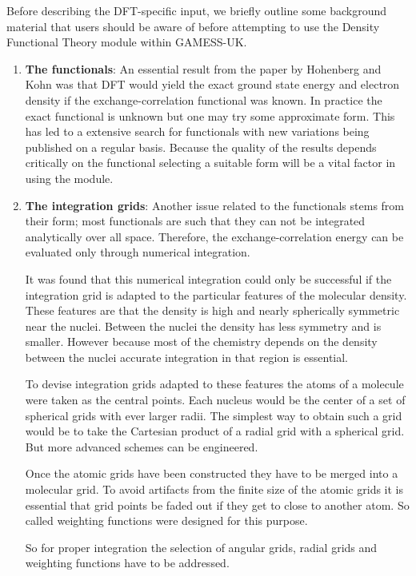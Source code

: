 \documentclass[11pt,fleqn]{article}
\begin{document}
Before describing the DFT-specific input, we briefly outline some 
background material that users should be aware of before attempting to
use the Density Functional Theory module within GAMESS-UK.
\begin{enumerate}
\item {\bf The functionals}:
An essential result from the paper by Hohenberg and Kohn \cite{hohen64}
was that DFT would yield the exact ground state energy and electron
density if the exchange-correlation functional was known. In practice
the exact functional is unknown but one may try some approximate form.
This has led to a extensive search for functionals with
new variations being published on a regular basis.  Because the quality of
the results depends critically on the functional selecting a suitable 
form will be a vital factor in using the module.

\item {\bf The integration grids}:
Another issue related to the functionals stems from their form; most
functionals are such that they can not be integrated analytically over
all space. Therefore, the exchange-correlation energy can be evaluated
only through numerical integration.

It was found that this numerical integration could only be successful if
the integration grid is adapted to the particular features of the
molecular density. These features are that the density is high and
nearly spherically symmetric near the nuclei. Between the nuclei the
density has less symmetry and is smaller. However because most of the
chemistry depends on the density between the nuclei accurate
integration in that region is essential.

To devise integration grids adapted to these features the atoms of a
molecule were taken as the central points. Each nucleus would be the
center of a set of spherical grids with ever larger radii. The simplest
way to obtain such a grid would be to take the Cartesian product of a
radial grid with a spherical grid.  But more advanced schemes can be
engineered.

Once the atomic grids have been constructed they have to be merged into
a molecular grid. To avoid artifacts from the finite size of the atomic
grids it is essential that grid points be faded out if they get to
close to another atom.  So called weighting functions were designed for
this purpose.

So for proper integration the selection of angular grids, radial grids and
weighting functions have to be addressed.


\end{enumerate}
\end{document}
